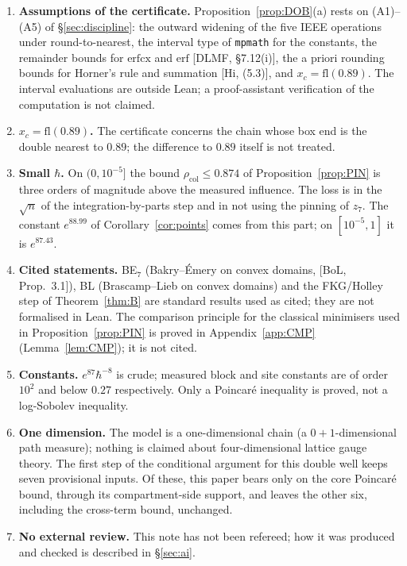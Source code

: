 \documentclass[11pt,a4paper]{article}
\theoremstyle{definition}
\theoremstyle{remark}
\newcommand{\xc}{x_c}
\newcommand{\rcol}{\rho_{\mathrm{col}}}
\newcommand{\code}[1]{\texttt{#1}}
\begin{document}
\begin{enumerate}[leftmargin=*]
\item \textbf{Assumptions of the certificate.} Proposition~\ref{prop:DOB}(a) rests on (A1)--(A5) of \S\ref{sec:discipline}: the outward widening of the five IEEE operations under round-to-nearest, the interval type of \code{mpmath} for the constants, the remainder bounds for $\mathrm{erfcx}$ and $\mathrm{erf}$ [DLMF, \S7.12(i)], the a priori rounding bounds for Horner's rule and summation [Hi, (5.3)], and $\xc=\mathrm{fl}(0.89)$. The interval evaluations are outside Lean; a proof-assistant verification of the computation is not claimed.
\item \textbf{$\xc=\mathrm{fl}(0.89)$.} The certificate concerns the chain whose box end is the double nearest to $0.89$; the difference to $0.89$ itself is not treated.
\item \textbf{Small $\hbar$.} On $(0,10^{-5}]$ the bound $\rcol\le0.874$ of Proposition~\ref{prop:PIN} is three orders of magnitude above the measured influence. The loss is in the $\sqrt n$ of the integration-by-parts step and in not using the pinning of $z_7$. The constant $e^{88.99}$ of Corollary~\ref{cor:points} comes from this part; on $[10^{-5},1]$ it is $e^{87.43}$.
\item \textbf{Cited statements.} BE$_7$ (Bakry--\'Emery on convex domains, [BoL, Prop.~3.1]), BL (Brascamp--Lieb on convex domains) and the FKG/Holley step of Theorem~\ref{thm:B} are standard results used as cited; they are not formalised in Lean. The comparison principle for the classical minimisers used in Proposition~\ref{prop:PIN} is proved in Appendix~\ref{app:CMP} (Lemma~\ref{lem:CMP}); it is not cited.
\item \textbf{Constants.} $e^{87}\hbar^{-8}$ is crude; measured block and site constants are of order $10^2$ and below $0.27$ respectively. Only a Poincar\'e inequality is proved, not a log-Sobolev inequality.
\item \textbf{One dimension.} The model is a one-dimensional chain (a $0+1$-dimensional path measure); nothing is claimed about four-dimensional lattice gauge theory. The first step of the conditional argument for this double well keeps seven provisional inputs. Of these, this paper bears only on the core Poincar\'e bound, through its compartment-side support, and leaves the other six, including the cross-term bound, unchanged.
\item \textbf{No external review.} This note has not been refereed; how it was produced and checked is described in \S\ref{sec:ai}.
\end{enumerate}
\end{document}
